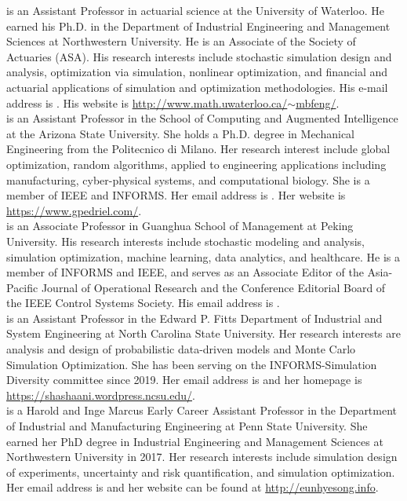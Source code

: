 \documentclass{article}
\begin{document}
 is an Assistant Professor in actuarial science at the University of Waterloo. He earned his Ph.D. in the Department of Industrial Engineering and Management Sciences at Northwestern University. He is an Associate of the Society of Actuaries (ASA). His research interests include stochastic simulation design and analysis, optimization via simulation, nonlinear optimization, and financial and actuarial applications of simulation and optimization methodologies. His e-mail address is . His website is \href{http://www.math.uwaterloo.ca/~mbfeng/}{http://www.math.uwaterloo.ca/$\sim$mbfeng/}.\\

 is an Assistant Professor in the School of Computing and Augmented Intelligence at the Arizona State University. She holds a Ph.D. degree in Mechanical Engineering from the Politecnico di Milano. Her research interest include global optimization, random algorithms, applied to engineering applications including manufacturing, cyber-physical systems, and computational biology. She is a member of IEEE and INFORMS. Her email address is . Her website is \url{https://www.gpedriel.com/}.\\

 is an Associate Professor in Guanghua School of Management at Peking University. His research interests include stochastic modeling and analysis, simulation optimization, machine learning, data analytics, and healthcare. He is a member of INFORMS and IEEE, and serves as an Associate Editor of the Asia-Pacific Journal of Operational Research and  the Conference Editorial Board of the IEEE Control Systems Society. His email address is .\\

 is an Assistant Professor in the Edward P. Fitts Department of Industrial and System Engineering at North Carolina State University. Her research interests are analysis and design of probabilistic data-driven models and Monte Carlo Simulation Optimization. She has been serving on the INFORMS-Simulation Diversity committee since 2019. Her email address is  and her homepage is \url{https://shashaani.wordpress.ncsu.edu/}.\\

 is a Harold and Inge Marcus Early Career Assistant Professor in the Department of Industrial and Manufacturing Engineering at Penn State University. She earned her PhD degree in Industrial Engineering and Management Sciences at Northwestern University in 2017. Her research interests include simulation design of experiments, uncertainty and risk quantification, and simulation optimization. Her email address is  and her website can be found at \href{http://eunhyesong.info}{http://eunhyesong.info}.\\
\end{document}
